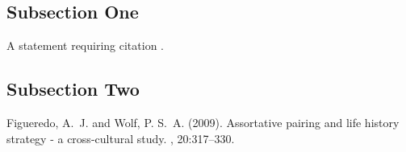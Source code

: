 \documentclass{article}
\begin{document}
\subsection{Subsection One}

A statement requiring citation \cite{Figueredo:2009dg}.
\blindtext %

\subsection{Subsection Two}

\blindtext %


\begin{thebibliography}{99} %

Figueredo, A.~J. and Wolf, P. S.~A. (2009).
\newblock Assortative pairing and life history strategy - a cross-cultural
  study.
, 20:317--330.
 
\end{thebibliography}

\end{document}
